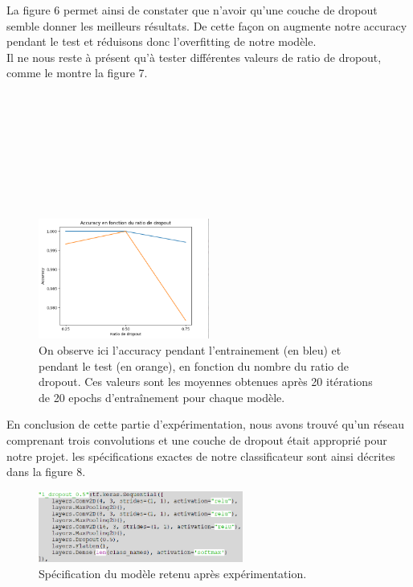 \documentclass{article}
\begin{document}
La figure 6 permet ainsi de constater que n'avoir qu'une couche de dropout semble donner les meilleurs résultats. De cette façon on augmente notre accuracy pendant le test et réduisons donc l'overfitting de notre modèle.\\

Il ne nous reste à présent qu'à tester différentes valeurs de ratio de dropout, comme le montre la figure 7.\\\\\\\\\\\\\\\\\\

\begin{figure}[ht]
\centering
\includegraphics[width=0.5\textwidth]{dropout_ratio.png}
\caption{\label{fig:Input}On observe ici l'accuracy pendant l'entrainement (en bleu) et pendant le test (en orange), en fonction du nombre du ratio de dropout. Ces valeurs sont les moyennes obtenues après 20 itérations de 20 epochs d'entraînement pour chaque modèle.}
\end{figure}

En conclusion de cette partie d'expérimentation, nous avons trouvé qu'un réseau comprenant trois convolutions et une couche de dropout était approprié pour notre projet. les spécifications exactes de notre classificateur sont ainsi décrites dans la figure 8.
\begin{figure}[h]
\centering
\includegraphics[width=0.6\textwidth]{model_specs_final.png}
\caption{\label{fig:Input}Spécification du modèle retenu après expérimentation.}
\end{figure}
\end{document}

